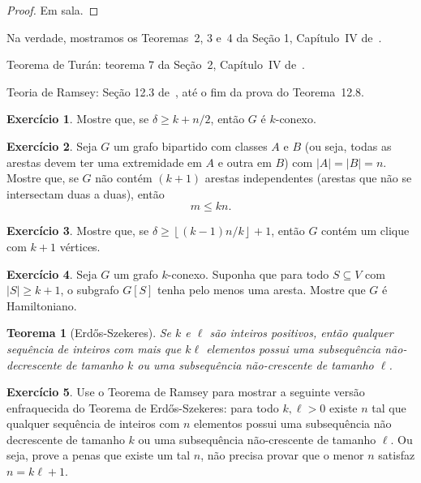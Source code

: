 \documentclass[12pt, a4paper]{article}
\newtheorem{teor}{Teorema}[section]
\theoremstyle{definition}
\newtheorem{exer}{Exercício}
\begin{document}
\begin{proof}
  Em sala.
\end{proof}

\noindent Na verdade, mostramos os Teoremas~2, 3 e~4 da Seção 1, Capítulo~IV de~\cite{Bollobas}.\bigskip

\noindent Teorema de Turán: teorema 7 da Seção~2, Capítulo~IV de~\cite{Bollobas}.\bigskip

\noindent Teoria de Ramsey: Seção 12.3 de~\cite{BondyMurty}, até o fim da prova do Teorema~12.8.

\begin{exer}
  Mostre que, se $\delta \geq k + n / 2$, então $G$ é $k$-conexo. 
\end{exer}

\begin{exer}
  Seja $G$ um grafo bipartido com classes $A$ e $B$ (ou seja, todas as arestas devem ter uma extremidade em $A$ e outra em $B$) com $|A| = |B| = n$. Mostre que, se $G$ não contém $(k+1)$ arestas independentes (arestas que não se intersectam duas a duas), então 
\[ m \leq k n. \]
\end{exer}

\begin{exer}
  Mostre que, se $\delta \geq \left \lfloor (k - 1) n / k \right \rfloor + 1$, então $G$ contém um clique com $k + 1$ vértices.
\end{exer}

\begin{exer}
  Seja $G$ um grafo $k$-conexo. Suponha que para todo $S \subseteq V$ com $|S| \geq k + 1$, o subgrafo $G[S]$ tenha pelo menos uma aresta. Mostre que $G$ é Hamiltoniano. 
\end{exer}

\begin{teor}[Erd\H{o}s-Szekeres]
Se $k$ e $\ell$ são inteiros positivos, então qualquer sequência de inteiros com mais que $k \ell$ elementos possui uma sub\-se\-quên\-cia não-decrescente de tamanho $k$ ou uma subsequência não-crescente de tamanho $\ell$.
\end{teor}

\begin{exer}
  Use o Teorema de Ramsey para mostrar a seguinte versão enfraquecida do Teorema de Erd\H{o}s-Szekeres: para todo $k, \ell > 0$ existe $n$ tal que qualquer sequência de inteiros com $n$ elementos possui uma subsequência não decrescente de tamanho $k$ ou uma subsequência não-crescente de tamanho $\ell$. Ou seja, prove a penas que existe um tal $n$, não precisa provar que o menor $n$ satisfaz $n = k \ell + 1$.
\end{exer}



\end{document}
